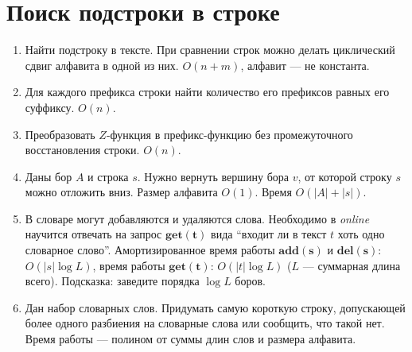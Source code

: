 \section*{Поиск подстроки в строке}
\begin{enumerate}
	\item Найти подстроку в тексте. При сравнении строк можно делать циклический сдвиг алфавита в одной из них. 
	$O(n + m)$, алфавит — не константа.
	
	\item Для каждого префикса строки найти количество его префиксов равных его суффиксу. $O(n)$.
	
	\item Преобразовать $Z$-функция в префикс-функцию без промежуточного восстановления строки. $O(n)$.
	
	\item Даны бор $A$ и строка $s$. Нужно вернуть вершину бора $v$, от которой строку $s$ можно отложить вниз. 
	Размер алфавита $O(1)$. Время $O(|A| + |s|)$.
	
	\item В словаре могут добавляются и удаляются слова. Необходимо в \textit{online} научится отвечать на запрос 
	$\mathbf{get(t)}$ вида “входит ли в текст $t$ хоть одно словарное слово”. Амортизированное время работы 
	$\mathbf{add(s)}$ и $\mathbf{del(s)}$: $O(|s| \log L)$, время работы $\mathbf{get(t)}$: $O(|t| \log L)$ ($L$ — 
	суммарная длина всего). Подсказка: заведите порядка $\log L$ боров.
	
	\item Дан набор словарных слов. Придумать самую короткую строку, допускающей более одного разбиения на 
	словарные слова или сообщить, что такой нет. Время работы — полином от суммы длин слов и размера алфавита.
\end{enumerate}
